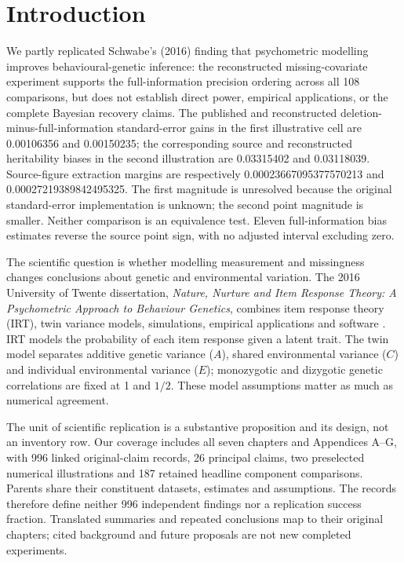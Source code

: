 \documentclass[11pt]{article}
\begin{document}
\section{Introduction}\label{sec:intro}
We partly replicated Schwabe's (2016) finding that psychometric modelling improves behavioural-genetic inference: the reconstructed missing-covariate experiment supports the full-information precision ordering across all 108 comparisons, but does not establish direct power, empirical applications, or the complete Bayesian recovery claims. The published and reconstructed deletion-minus-full-information standard-error gains in the first illustrative cell are 0.00106356 and 0.00150235; the corresponding source and reconstructed heritability biases in the second illustration are 0.03315402 and 0.03118039. Source-figure extraction margins are respectively 0.00023667095377570213 and 0.00027219389842495325. The first magnitude is unresolved because the original standard-error implementation is unknown; the second point magnitude is smaller. Neither comparison is an equivalence test. Eleven full-information bias estimates reverse the source point sign, with no adjusted interval excluding zero.

The scientific question is whether modelling measurement and missingness changes conclusions about genetic and environmental variation. The 2016 University of Twente dissertation, \emph{Nature, Nurture and Item Response Theory: A Psychometric Approach to Behaviour Genetics}, combines item response theory (IRT), twin variance models, simulations, empirical applications and software \citep{schwabe2016}. IRT models the probability of each item response given a latent trait. The twin model separates additive genetic variance ($A$), shared environmental variance ($C$) and individual environmental variance ($E$); monozygotic and dizygotic genetic correlations are fixed at 1 and $1/2$. These model assumptions matter as much as numerical agreement.

The unit of scientific replication is a substantive proposition and its design, not an inventory row. Our coverage includes all seven chapters and Appendices A--G, with 996 linked original-claim records, 26 principal claims, two preselected numerical illustrations and 187 retained headline component comparisons. Parents share their constituent datasets, estimates and assumptions. The records therefore define neither 996 independent findings nor a replication success fraction. Translated summaries and repeated conclusions map to their original chapters; cited background and future proposals are not new completed experiments.
\end{document}
